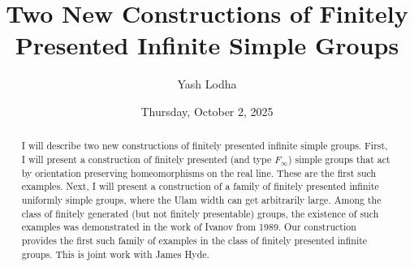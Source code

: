 \documentclass{UAmathtalk}
\author{Yash Lodha}
\title{Two New Constructions of Finitely Presented Infinite Simple Groups}
\date{Thursday, October 2, 2025}
\begin{document}
\maketitle

\begin{abstract}
I will describe two new constructions of finitely presented infinite simple groups. First, I will present a construction of finitely presented (and type $F_{\infty}$) simple groups that act by orientation preserving homeomorphisms on the real line. These are the first such examples. Next, I will present a construction of a family of finitely presented infinite uniformly simple groups, where the Ulam width can get arbitrarily large. Among the class of finitely generated (but not finitely presentable) groups, the existence of such examples was demonstrated in the work of Ivanov from 1989. Our construction provides the first such family of examples in the class of finitely presented infinite groups. This is joint work with James Hyde.
\end{abstract}
\end{document}
